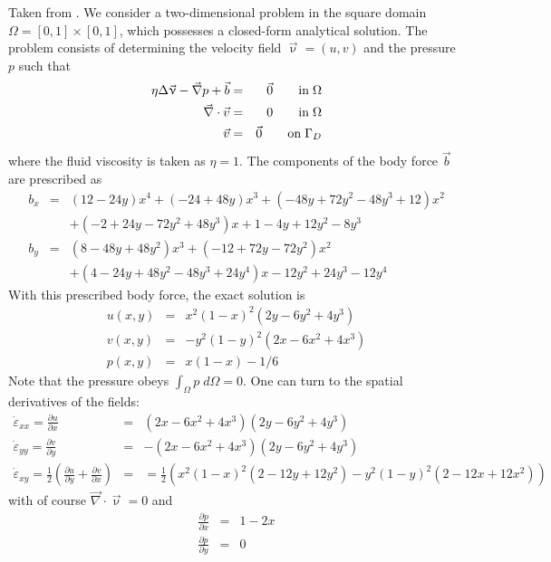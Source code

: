 Taken from \cite{dohu03}. We consider a two-dimensional problem 
in the square domain $\Omega=[0,1]\times[0,1]$, which possesses a closed-form analytical 
solution. The problem consists of determining the velocity field ${\vec \upnu} = (u,v)$ 
and the pressure $p$ such that 
\begin{eqnarray}
\eta \Delta {\vec \upnu} - {\vec \nabla} p + {\vec b} &=& \vec 0 \quad\quad {\rm in} \; \Omega\\
\vec{\nabla} \cdot \vec{v} &=& 0 \quad\quad {\rm in} \; \Omega\\
\vec{v}&=&\vec{0} \quad\quad {\rm on} \; \Gamma_D
\end{eqnarray}
where the fluid viscosity is taken as $\eta=1$.
The components of the body force $\vec{b}$ are prescribed as 
\begin{eqnarray}
b_x &=& (12 - 24y) x^4 + (-24 + 48y) x^3 + (-48y + 72y^2 - 48 y^3 + 12) x^2 \nonumber\\
    && + (-2 + 24y -72y^2+48y^3)x + 1-4y + 12y^2-8y^3 \nonumber\\ 
b_y &=& (8 - 48y + 48 y^2) x^3 + (-12 + 72y - 72y^2) x^2  \nonumber\\
    && + (4 - 24y + 48y^2 - 48y^3 + 24y^4) x - 12y^2 + 24y^3 - 12y^4  \nonumber
\end{eqnarray}
With this prescribed body force, the exact solution is 
\begin{eqnarray}
u(x,y) &=& x^2(1- x)^2 (2y - 6y^2 + 4y^3)  \nonumber\\
v(x,y) &=& -y^2 (1 - y)^2 (2x - 6x^2 + 4x^3) \nonumber\\
p(x,y) &=& x(1 -x)- 1/6 \nonumber 
\end{eqnarray}
Note that the pressure obeys $\int_{\Omega} p \; d\Omega = 0$.
One can turn to the spatial derivatives of the fields:
\begin{eqnarray}
\dot{\varepsilon}_{xx}=\frac{\partial u}{\partial x} &=&  (2x -6x^2 +4 x^3 ) (2y - 6y^2 + 4y^3)  \\
\dot{\varepsilon}_{yy}=\frac{\partial v}{\partial y} &=&  - (2x -6x^2 +4 x^3 ) (2y - 6y^2 + 4y^3)  \\
\dot{\varepsilon}_{xy}=\frac{1}{2}\left(\frac{\partial u}{\partial y}+\frac{\partial v}{\partial x}\right) 
&=&=\frac{1}{2}\left( x^2(1- x)^2 ( 2-12y+12y^2  ) -y^2 (1-y)^2 (2-12x+12x^2) \right)
\end{eqnarray}
with of course  ${\vec \nabla} \cdot {\vec \upnu} = 0$ and 
\begin{eqnarray}
\frac{\partial p}{\partial x} &=& 1-2x  \\
\frac{\partial p}{\partial y} &=& 0
\end{eqnarray}


